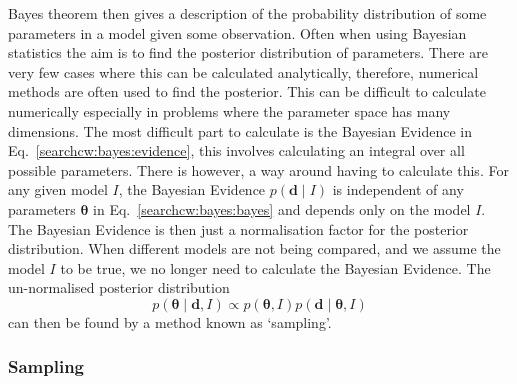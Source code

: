 Bayes theorem then gives a description of the probability distribution of some
parameters in a model given some observation.  Often when using Bayesian
statistics the aim is to find the posterior distribution of parameters.  There are
very few cases where this can be calculated analytically, therefore, numerical
methods are often used to find the posterior.  This
can be difficult to calculate numerically especially in problems where the
parameter space has many dimensions.  The most difficult part to calculate is
the Bayesian Evidence in Eq.~\ref{searchcw:bayes:evidence}, this involves calculating an
integral over all possible parameters.  There is however, a way around having
to calculate this.  For any given model $I$, the Bayesian Evidence $p({\bm d}\mid I)$ is
independent of any parameters ${\bm \theta}$ in
Eq.~\ref{searchcw:bayes:bayes} and depends only on the model $I$.
The Bayesian Evidence is then just a normalisation factor for the posterior
distribution.  When different models are not being compared, and we assume the
model $I$ to be true, we no longer need to calculate the Bayesian Evidence.  The
un-normalised posterior distribution
%
\begin{equation}
p({\bm \theta} \mid {\bm d}, I) \propto p({\bm \theta}, I)p({\bm d} \mid {\bm \theta}, I)
\end{equation}
can then be found by a method known as `sampling'.


\subsubsection{Sampling}

